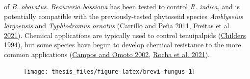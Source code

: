 \documentclass[12pt,final,CPage]{ufthesis}
\begin{document}
{of \emph{B. obovatus}. \emph{Beauveria bassiana} has been tested to control \emph{R. indica}, and is potentially compatible with the previously-tested phytoseiid species \emph{Amblyseius largoensis} and \emph{Typhlodromus ornatus} (\protect\hyperlink{ref-Carrillo2011}{Carrillo and Peña 2011}, \protect\hyperlink{ref-Freitas2021}{Freitas et al. 2021}). Chemical applications are typically used to control tenuipalpids (\protect\hyperlink{ref-Childers1994}{Childers 1994}), but some species have begun to develop chemical resistance to the more common applications (\protect\hyperlink{ref-Campos2002}{Campos and Omoto 2002}, \protect\hyperlink{ref-Rocha2021}{Rocha et al. 2021}).
  \begin{figure}

  {\centering \texttt{[image: thesis\_files/figure-latex/brevi-fungus-1]} 

  }


\end{figure}}
\end{document}
